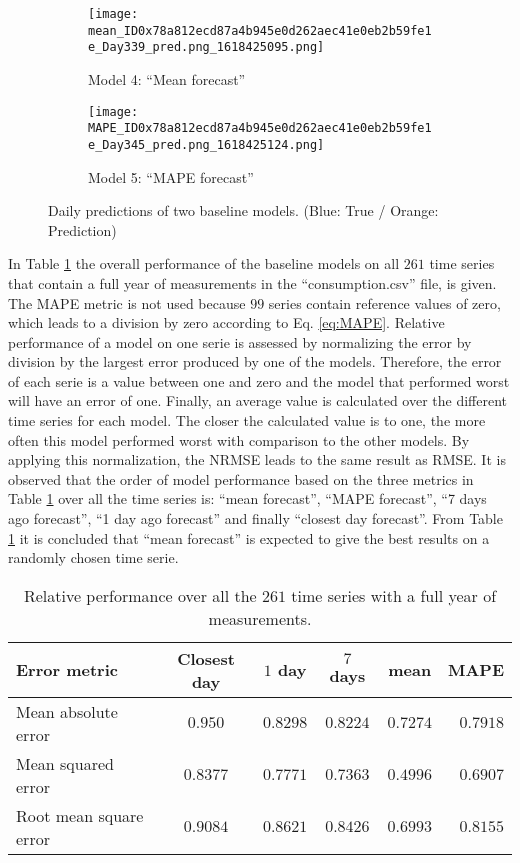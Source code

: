 \begin{figure}[ht]
	\begin{subfigure}{0.5\textwidth}
		\texttt{[image: mean\_ID0x78a812ecd87a4b945e0d262aec41e0eb2b59fe1e\_Day339\_pred.png\_1618425095.png]}
		\caption{Model 4: ``Mean forecast''}
	\end{subfigure}	
	\begin{subfigure}{0.5\textwidth}
		\texttt{[image: MAPE\_ID0x78a812ecd87a4b945e0d262aec41e0eb2b59fe1e\_Day345\_pred.png\_1618425124.png]}
		\caption{Model 5: ``MAPE forecast''}
	\end{subfigure}
	\caption{Daily predictions of two baseline models. (Blue: True / Orange: Prediction) }
	\label{fig:baseline models 4 and 5}
\end{figure}


In Table \ref{tab:summ_data_rel_performance} the overall performance of the baseline models on all $ 261 $ time series that contain a full year of measurements in the ``consumption.csv'' file, is given. The MAPE metric is not used because $ 99 $ series contain reference values of zero, which leads to a division by zero according to Eq. \ref{eq:MAPE}. Relative performance of a model on one serie is assessed by normalizing the error by division by the largest error produced by one of the models. Therefore, the error of each serie is a value between one and zero and the model that performed worst will have an error of one. Finally, an average value is calculated over the different time series for each model. The closer the calculated value is to one, the more often this model performed worst with comparison to the other models. By applying this normalization, the NRMSE leads to the same result as RMSE. It is observed that the order of model performance based on the three metrics in Table \ref{tab:summ_data_rel_performance} over all the time series is: ``mean forecast'', ``MAPE forecast'', ``7 days ago forecast'', ``1 day ago forecast'' and finally ``closest day forecast''. From Table \ref{tab:summ_data_rel_performance} it is concluded that ``mean forecast'' is expected to give the best results on a randomly chosen time serie.

\begin{table}[ht]
	\centering
	\begin{tabular}{@{}l|ccccr@{}} \toprule
		\textbf{Error metric}	& \textbf{Closest day} & \textbf{$ 1 $ day} & \textbf{$ 7 $ days} & \textbf{mean} & \textbf{MAPE}\\\midrule
		Mean absolute error& \cellcolor{red!25}$0.950 $&$ 0.8298 $  & $0.8224 $ & \cellcolor{green!25}$ 0.7274 $ & $ 0.7918 $\\
		Mean squared error& \cellcolor{red!25}$0.8377 $&$ 0.7771 $  & $0.7363 $ & \cellcolor{green!25}$ 0.4996 $ & $ 0.6907 $\\
		Root mean square error& \cellcolor{red!25}$0.9084 $&$ 0.8621$  & $0.8426$ & \cellcolor{green!25}$ 0.6993$ & $ 0.8155$\\\bottomrule
	\end{tabular}
	\caption{Relative performance over all the $ 261 $ time series with a full year of measurements.}
	\label{tab:summ_data_rel_performance}
\end{table}



